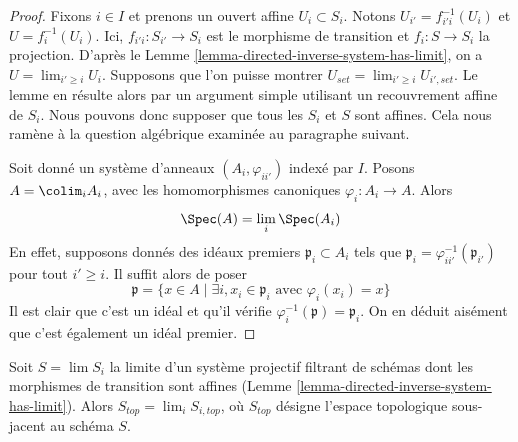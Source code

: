 \begin{proof}
Fixons $i \in I$ et prenons un ouvert affine $U_i \subset S_i$.
Notons $U_{i'} = f_{i'i}^{-1}(U_i)$ et $U = f_i^{-1}(U_i)$. Ici,
$f_{i'i} : S_{i'} \to S_i$ est le morphisme de transition et
$f_i : S \to S_i$ la projection. D'après le
Lemme \ref{lemma-directed-inverse-system-has-limit}, on a
$U = \lim_{i' \geq i} U_i$. Supposons que l'on puisse montrer
$U_{set} = \lim_{i' \geq i} U_{i', set}$. Le lemme en résulte alors par un
argument simple utilisant un recouvrement affine de $S_i$. Nous pouvons
donc supposer que tous les $S_i$ et $S$ sont affines. Cela nous ramène à la
question algébrique examinée au paragraphe suivant.

\medskip\noindent
Soit donné un système d'anneaux $(A_i, \varphi_{ii'})$ indexé par $I$.
Posons $A = \colim_i A_i$, avec les homomorphismes canoniques
$\varphi_i : A_i \to A$. Alors
$$
\Spec(A) = \lim_i \Spec(A_i)
$$
En effet, supposons donnés des idéaux premiers
$\mathfrak p_i \subset A_i$ tels que
$\mathfrak p_i = \varphi_{ii'}^{-1}(\mathfrak p_{i'})$ pour tout
$i' \geq i$. Il suffit alors de poser
$$
\mathfrak p =
\{x \in A
\mid
\exists i, x_i \in \mathfrak p_i \text{ avec }\varphi_i(x_i) = x\}
$$
Il est clair que c'est un idéal et qu'il vérifie
$\varphi_i^{-1}(\mathfrak p) = \mathfrak p_i$. On en déduit aisément que
c'est également un idéal premier.
\end{proof}

\begin{lemma}
\label{lemma-inverse-limit-top}
\begin{reference}
\cite[IV, Proposition 8.2.9]{EGA}
\end{reference}
Soit $S = \lim S_i$ la limite d'un système projectif filtrant de schémas
dont les morphismes de transition sont affines
(Lemme \ref{lemma-directed-inverse-system-has-limit}). Alors
$S_{top} = \lim_i S_{i, top}$, où $S_{top}$ désigne l'espace topologique
sous-jacent au schéma $S$.
\end{lemma}

